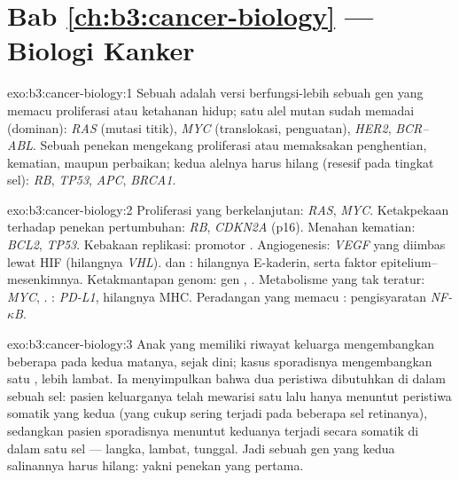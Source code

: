 \section*{Bab \ref{ch:b3:cancer-biology} --- Biologi Kanker}

\begin{solution}{exo:b3:cancer-biology:1}
Sebuah  adalah versi berfungsi-lebih sebuah gen yang memacu
proliferasi atau ketahanan hidup; satu alel mutan sudah memadai (dominan):
\emph{RAS} (mutasi titik), \emph{MYC} (translokasi, penguatan),
\emph{HER2}, \emph{BCR--ABL}. Sebuah penekan  mengekang
proliferasi atau memaksakan penghentian, kematian, maupun perbaikan; kedua
alelnya harus hilang (resesif pada tingkat sel): \emph{RB}, \emph{TP53},
\emph{APC}, \emph{BRCA1}.
\end{solution}

\begin{solution}{exo:b3:cancer-biology:2}
Proliferasi yang berkelanjutan: \emph{RAS}, \emph{MYC}. Ketakpekaan terhadap
penekan pertumbuhan: \emph{RB}, \emph{CDKN2A} (p16). Menahan kematian:
\emph{BCL2}, \emph{TP53}. Kebakaan replikasi: promotor .
Angiogenesis: \emph{VEGF} yang diimbas lewat HIF (hilangnya \emph{VHL}).
 dan : hilangnya E-kaderin, serta faktor
epitelium--mesenkimnya. Ketakmantapan genom: gen , \emph{}. Metabolisme yang tak teratur: \emph{MYC}, .
: \emph{PD-L1}, hilangnya MHC. Peradangan yang memacu
: pengisyaratan \emph{NF-$\kappa$B}.
\end{solution}

\begin{solution}{exo:b3:cancer-biology:3}
Anak yang memiliki riwayat keluarga mengembangkan beberapa  pada kedua
matanya, sejak dini; kasus sporadisnya mengembangkan satu , lebih lambat.
Ia menyimpulkan bahwa dua peristiwa dibutuhkan di dalam sebuah sel: pasien
keluarganya telah mewarisi satu lalu hanya menuntut peristiwa somatik yang
kedua (yang cukup sering terjadi pada beberapa sel retinanya), sedangkan
pasien sporadisnya menuntut keduanya terjadi secara somatik di dalam satu sel
--- langka, lambat, tunggal. Jadi sebuah gen yang kedua salinannya harus
hilang: yakni penekan  yang pertama.
\end{solution}

